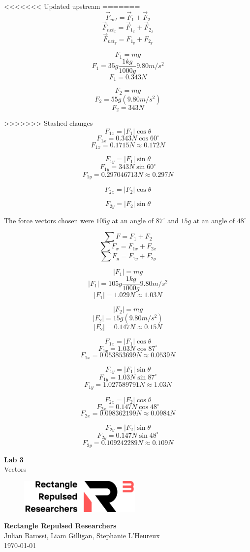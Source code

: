\documentclass[11pt, letterpaper, includehead]{article}
\begin{document}
<<<<<<< Updated upstream
=======
$$\vec{F}_{net} = \vec{F}_{1} + \vec{F}_{2}$$
$$\vec{F}_{net_x} = \vec{F}_{1_x} + \vec{F}_{2_x}$$
$$\vec{F}_{net_y} = F_{1_y} + F_{2_y}$$



$$F_1 = mg$$
$$F_1 = 35g\frac{1kg}{1000g}9.80m/s^2$$
$$F_1 = 0.343N$$

$$F_2 = mg$$
$$F_2 = 55g(9.80m/s^2)$$
$$F_2 = 343N$$

>>>>>>> Stashed changes
$$F_{1x} = |F_1|\cos\theta$$
$$F_{1x} = 0.343N\cos60^{\circ}$$
$$F_{1x} = 0.1715N \approx 0.172N$$

$$F_{1y} = |F_1|\sin\theta$$
$$F_{1y} = 343N\sin60^{\circ}$$
$$F_{1y} = 0.297046713N \approx 0.297N$$

$$F_{2x} = |F_2|\cos\theta$$

$$F_{2y} = |F_2|\sin\theta$$


The force vectors chosen were $105g$ at an angle of $87^{\circ}$ and $15g$ at an angle of $48^{\circ}$

$$\sum F = F_{1} + F_{2}$$
$$\sum F_x = F_{1x} + F_{2x}$$
$$\sum F_y = F_{1y} + F_{2y}$$

$$|F_1| = mg$$
$$|F_1| = 105g\frac{1kg}{1000g}9.80m/s^2$$
$$|F_1| = 1.029N \approx 1.03N$$

$$|F_2| = mg$$
$$|F_2| = 15g(9.80m/s^2)$$
$$|F_2| = 0.147N \approx 0.15N$$

$$F_{1x} = |F_1|\cos\theta$$
$$F_{1x} = 1.03N\cos87^{\circ}$$
$$F_{1x} = 0.053853699N \approx 0.0539N$$

$$F_{1y} = |F_1|\sin\theta$$
$$F_{1y} = 1.03N\sin87^{\circ}$$
$$F_{1y} = 1.027589791N \approx 1.03N$$

$$F_{2x} = |F_2|\cos\theta$$
$$F_{2x} = 0.147N\cos48^{\circ}$$
$$F_{2x} = 0.098362199N \approx 0.0984N$$

$$F_{2y} = |F_2|\sin\theta$$
$$F_{2y} = 0.147N\sin48^{\circ}$$
$$F_{2y} = 0.109242289N \approx 0.109N$$



\begin{titlepage}
  \begin{center}
    \Huge{\textbf{Lab 3}}\\
    \Huge{Vectors}
    \vfill
    \begin{figure}[H] %
      \centering 
      \includegraphics[width=6cm]{../logo.png}
    \end{figure}
    \large{\textbf{Rectangle Repulsed Researchers}}\\
    \large{Julian Barossi, Liam Gilligan, Stephanie L'Heureux}\\
    \vspace{0.5cm}
    \normalsize
    \today
  \end{center}
\end{titlepage}
\end{document}
